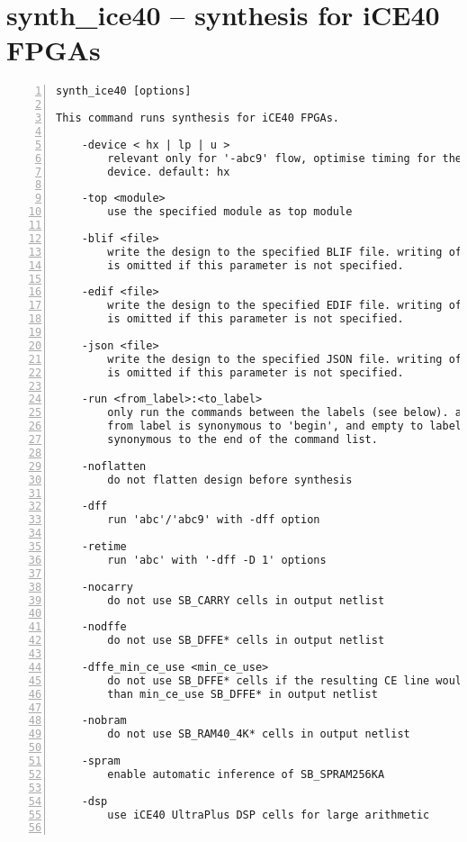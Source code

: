 \section{synth\_ice40 -- synthesis for iCE40 FPGAs}
\label{cmd:synth_ice40}
\begin{lstlisting}[numbers=left,frame=single]
    synth_ice40 [options]

This command runs synthesis for iCE40 FPGAs.

    -device < hx | lp | u >
        relevant only for '-abc9' flow, optimise timing for the specified
        device. default: hx

    -top <module>
        use the specified module as top module

    -blif <file>
        write the design to the specified BLIF file. writing of an output file
        is omitted if this parameter is not specified.

    -edif <file>
        write the design to the specified EDIF file. writing of an output file
        is omitted if this parameter is not specified.

    -json <file>
        write the design to the specified JSON file. writing of an output file
        is omitted if this parameter is not specified.

    -run <from_label>:<to_label>
        only run the commands between the labels (see below). an empty
        from label is synonymous to 'begin', and empty to label is
        synonymous to the end of the command list.

    -noflatten
        do not flatten design before synthesis

    -dff
        run 'abc'/'abc9' with -dff option

    -retime
        run 'abc' with '-dff -D 1' options

    -nocarry
        do not use SB_CARRY cells in output netlist

    -nodffe
        do not use SB_DFFE* cells in output netlist

    -dffe_min_ce_use <min_ce_use>
        do not use SB_DFFE* cells if the resulting CE line would go to less
        than min_ce_use SB_DFFE* in output netlist

    -nobram
        do not use SB_RAM40_4K* cells in output netlist

    -spram
        enable automatic inference of SB_SPRAM256KA

    -dsp
        use iCE40 UltraPlus DSP cells for large arithmetic


\end{lstlisting}
